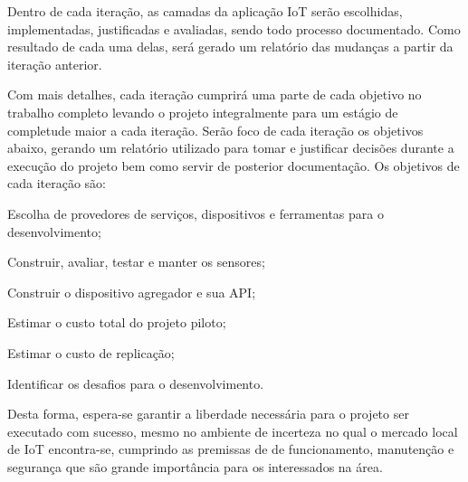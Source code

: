 Dentro de cada iteração, as camadas da aplicação IoT serão escolhidas,
implementadas, justificadas e avaliadas, sendo todo processo documentado. Como
resultado de cada uma delas, será gerado um relatório das mudanças a partir da
iteração anterior.

Com mais detalhes, cada iteração cumprirá uma parte de cada objetivo no trabalho
completo levando o projeto integralmente para um estágio de completude maior a
cada iteração. Serão foco de cada iteração os objetivos abaixo, gerando um
relatório utilizado para tomar e justificar decisões durante a execução do
projeto bem como servir de posterior documentação. Os objetivos de cada iteração
são:

\begin{alineas}

	\item Escolha de provedores de serviços, dispositivos e ferramentas para o
desenvolvimento;

	\item Construir, avaliar, testar e manter os sensores;

	\item Construir o dispositivo agregador e sua API;

	\item Estimar o custo total do projeto piloto;

	\item Estimar o custo de replicação;

	\item Identificar os desafios para o desenvolvimento.

\end{alineas}

Desta forma, espera-se garantir a liberdade necessária para o projeto ser
executado com sucesso, mesmo no ambiente de incerteza no qual o mercado local de
IoT encontra-se, cumprindo as premissas de de funcionamento, manutenção e
segurança que são grande importância para os interessados na área.
